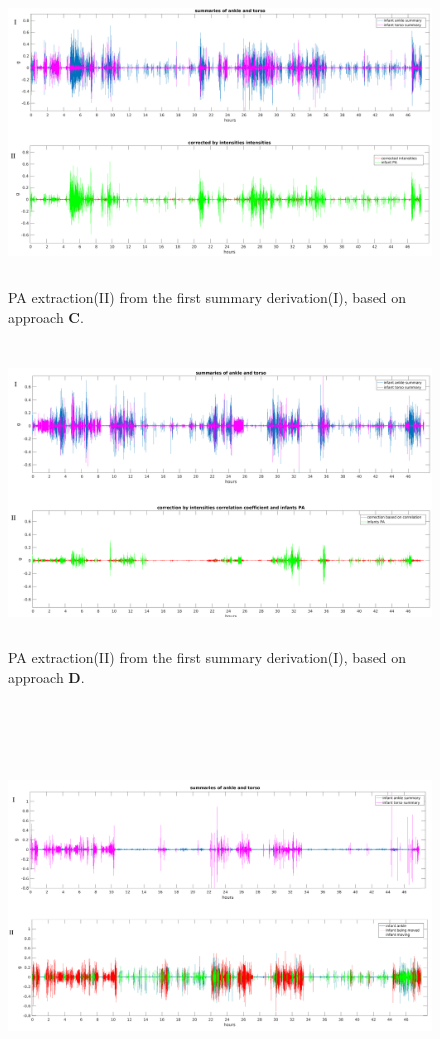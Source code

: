 \documentclass{article}
\begin{document}
{\begin{figure}[h]
\includegraphics[width=15cm, height=8cm]{CorrectedIntensitiesPA.png}
\caption{PA extraction(II) from the first summary derivation(I), based on approach \textbf{C}.}
\end{figure}
\newpage
\begin{figure}[h!]
\includegraphics[width=15cm, height=8cm]{CorrectedCorrelationResultPA.png}
\caption{PA extraction(II) from the first summary derivation(I), based on approach \textbf{D}.}
\end{figure}
\\\\
\begin{figure}[h!]
\includegraphics[width=15cm, height=8cm]{approachEPA.png}

\end{figure}}
\end{document}
